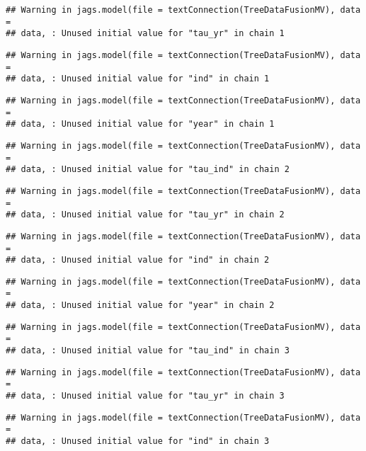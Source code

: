 \documentclass[]{article}
\begin{document}
\begin{verbatim}
## Warning in jags.model(file = textConnection(TreeDataFusionMV), data =
## data, : Unused initial value for "tau_yr" in chain 1
\end{verbatim}

\begin{verbatim}
## Warning in jags.model(file = textConnection(TreeDataFusionMV), data =
## data, : Unused initial value for "ind" in chain 1
\end{verbatim}

\begin{verbatim}
## Warning in jags.model(file = textConnection(TreeDataFusionMV), data =
## data, : Unused initial value for "year" in chain 1
\end{verbatim}

\begin{verbatim}
## Warning in jags.model(file = textConnection(TreeDataFusionMV), data =
## data, : Unused initial value for "tau_ind" in chain 2
\end{verbatim}

\begin{verbatim}
## Warning in jags.model(file = textConnection(TreeDataFusionMV), data =
## data, : Unused initial value for "tau_yr" in chain 2
\end{verbatim}

\begin{verbatim}
## Warning in jags.model(file = textConnection(TreeDataFusionMV), data =
## data, : Unused initial value for "ind" in chain 2
\end{verbatim}

\begin{verbatim}
## Warning in jags.model(file = textConnection(TreeDataFusionMV), data =
## data, : Unused initial value for "year" in chain 2
\end{verbatim}

\begin{verbatim}
## Warning in jags.model(file = textConnection(TreeDataFusionMV), data =
## data, : Unused initial value for "tau_ind" in chain 3
\end{verbatim}

\begin{verbatim}
## Warning in jags.model(file = textConnection(TreeDataFusionMV), data =
## data, : Unused initial value for "tau_yr" in chain 3
\end{verbatim}

\begin{verbatim}
## Warning in jags.model(file = textConnection(TreeDataFusionMV), data =
## data, : Unused initial value for "ind" in chain 3
\end{verbatim}
\end{document}
